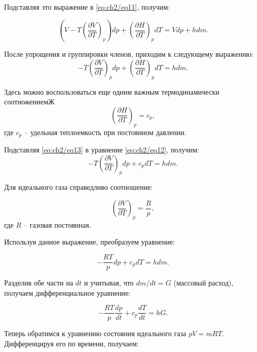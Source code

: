 Подставляя это выражение в \eqref{eq:ch2/eq11}, получим:

\begin{equation*}
    \left( V - T \left(
        \frac{\partial V}{\partial T}
        \right)_p \right) dp + \left(
    \frac{\partial H}{\partial T}
    \right)_p dT = Vdp + hdm.
\end{equation*}

После упрощения и группировки членов, приходим к следующему выражению:
\begin{equation}\label{eq:ch2/eq12}
    -T \left(
    \frac{\partial V}{\partial T}
    \right)_p dp + \left(
    \frac{\partial H}{\partial T}
    \right)_p dT = hdm.
\end{equation}

Здесь можно воспользоваться еще одним важным термодинамически соотножениемЖ
\begin{equation}\label{eq:ch2/eq13}
    \left(
    \frac{\partial H}{\partial T}
    \right)_p = c_p,
\end{equation}
где $c_p$ -- удельная теплоемкость при постоянном давлении.

Подставляя \eqref{eq:ch2/eq13} в уравнение \eqref{eq:ch2/eq12}, получим:
\begin{equation}\label{eq:ch2/eq14}
    -T \left(
    \frac{\partial V}{\partial T}
    \right)_p dp + c_p dT = hdm.
\end{equation}

Для идеального газа справедливо соотношение:

\begin{equation*}
    \left(\frac{\partial V}{\partial T}\right)_p = \frac{R}{p},
\end{equation*}
где $R$ -- газовая постоянная.

Используя данное выражение, преобразуем уравнение:

\begin{equation*}
    -\frac{RT}{p} dp + c_p dT = h dm.
\end{equation*}

Разделив обе части на $dt$ и учитывая, что $dm/dt = G$ (массовый расход), получаем дифференциальное уравнение:

\begin{equation*}
    -\frac{RT}{p} \frac{dp}{dt} + c_p \frac{dT}{dt} = hG.
\end{equation*}

Теперь обратимся к уравнению состояния идеального газа $pV = mRT$. Дифференцируя его по времени, получаем:

